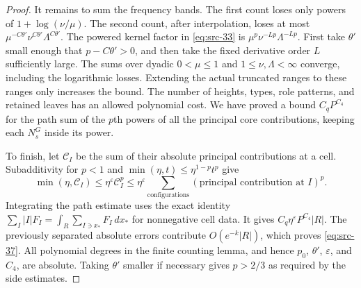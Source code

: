 \begin{proof}
It remains to sum the frequency bands.  The first count loses
only powers of $1+\log(\nu/\mu)$.  The second count, after
interpolation, loses at most
$\mu^{-C\theta'}\nu^{C\theta'}\Lambda^{C\theta'}$.
The powered kernel factor in \eqref{eq:src-33} is
$\mu^p\nu^{-Lp}\Lambda^{-Lp}$.  First take $\theta'$ small
enough that $p-C\theta'>0$, and then take the fixed derivative
order $L$ sufficiently large.  The sums over dyadic
$0<\mu\leq1$ and $1\leq\nu,\Lambda<\infty$ converge, including
the logarithmic losses.  Extending the actual truncated ranges
to these ranges only increases the bound.  The number of heights,
types, role patterns, and retained leaves has an allowed
polynomial cost.  We have proved a bound $C_qP^{C_4}$ for the
path sum of the $p$th powers of all the principal core
contributions, keeping each $N_s^G$ inside its power.

To finish, let $\mathcal C_I$ be the sum of their absolute
principal contributions at a cell.  Subadditivity for $p<1$
and $\min(\eta,t)\leq\eta^{1-p}t^p$ give
\[
 \min(\eta,\mathcal C_I)
 \leq\eta^\varepsilon\mathcal C_I^p
 \leq\eta^\varepsilon
       \sum_{\mathrm{configurations}}
              (\text{principal contribution at }I)^p.
\]
Integrating the path estimate uses the exact identity
$\sum_I|I|F_I=\int_R\sum_{I\ni x_*}F_I\,dx_*$
for nonnegative cell data.  It gives
$C_q\eta^\varepsilon P^{C_4}|R|$.  The previously separated
absolute errors contribute $O(e^{-k}|R|)$, which proves
\eqref{eq:src-37}.  All polynomial degrees in the finite counting
lemma, and hence $p_0$, $\theta'$, $\varepsilon$, and $C_4$, are
absolute.  Taking $\theta'$ smaller if necessary gives
$p>2/3$ as required by the side estimates.
\end{proof}
